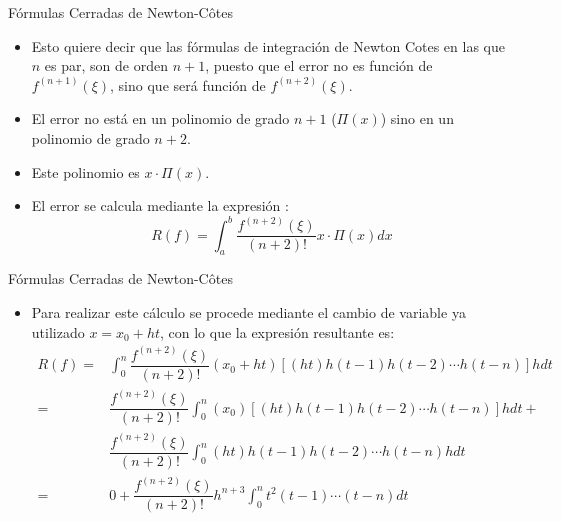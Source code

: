 \documentclass[12pt]{beamer}
\begin{document}
\begin{frame}{F\'ormulas Cerradas de Newton-C\^otes}
  \begin{itemize}
    \item Esto quiere decir que las fórmulas de integración de Newton Cotes en las que $n$ es par, son de orden $n+1$, puesto que el error no es función de $f^{(n+1)}(  \xi)$, sino que será función de $f^{(n+2)}(\xi)$.
    \item<2-> El error no está en un polinomio de grado $n+1$ ($\Pi(x)$) sino en un polinomio de grado $n + 2$.
    \item<3-> Este polinomio es $x\cdot\Pi(x)$.
    \item<4->El error se calcula mediante la expresión :
    $$
    R(f) = \int_{a}^{b}\dfrac{f^{(n+2)}(\xi)}{(n+2)!}x\cdot\Pi(x)dx 
    $$    
  \end{itemize}      
\end{frame}
\begin{frame}{F\'ormulas Cerradas de Newton-C\^otes}
  \begin{itemize}
    \item<1-> Para realizar este cálculo se procede mediante el cambio de variable ya utilizado $x = x_0 + ht$, con lo que la
    expresión resultante es:
    \small{
    \begin{align*}
      R(f)  = & \int_{0}^{n}\dfrac{f^{(n+2)}(\xi)}{(n+2)!}\left(x_0+ht\right)\left[(ht)h(t-1)h(t-2)\cdots h(t-n)\right]hdt \\
       = & \dfrac{f^{(n+2)}(\xi)}{(n+2)!}\int_{0}^{n}(x_0)[(ht)h(t-1)h(t-2)\cdots h(t-n)]hdt + \\
      & \dfrac{f^{(n+2)}(\xi)}{(n+2)!}\int_{0}^{n}(ht)h(t-1)h(t-2)\cdots h(t-n)hdt\\     
      = & 0 + \dfrac{f^{(n+2)}(\xi)}{(n+2)!}h^{n+3}\int_{0}^{n}t^2(t-1)\cdots(t-n)dt
    \end{align*}}
  \end{itemize}
\end{frame}
\end{document}
